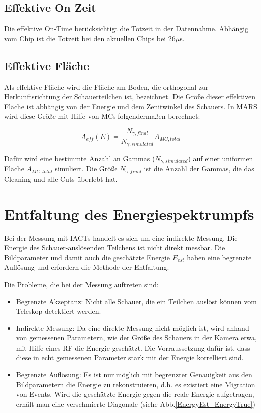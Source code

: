 \subsection{Effektive On Zeit}
Die effektive On-Time berücksichtigt die Totzeit in der Datennahme.
Abhängig vom Chip ist die Totzeit bei den aktuellen Chips bei 26$\mu$s.

\subsection{Effektive Fläche}
Als effektive Fläche wird die Fläche am Boden, die orthogonal zur Herkunftsrichtung der Schauerteilchen ist, bezeichnet.
Die Größe dieser effektiven Fläche ist abhängig von der Energie und dem Zenitwinkel des Schauers.
In MARS wird diese Größe mit Hilfe von MCs folgendermaßen berechnet:

\begin{equation}
 A_{eff}(E)=\frac{N_{\gamma, final}}{N_{\gamma, simulated}}A_{MC, total}
\end{equation}

Dafür wird eine bestimmte Anzahl an Gammas ($N_{\gamma, simulated}$) auf einer uniformen Fläche $A_{MC,total}$ simuliert. 
Die Größe $N_{\gamma, final}$ ist die Anzahl der Gammas, die das Cleaning und alle Cuts überlebt hat.


\section{Entfaltung des Energiespektrumpfs}
\label{sec:Unfolding}
Bei der Messung mit IACTs handelt es sich um eine indirekte Messung.
Die Energie des Schauer-auslösenden Teilchens ist nicht direkt messbar.
Die Bildparameter und damit auch die geschätzte Energie $E_{est}$ haben eine begrenzte Auflösung und erfordern die Methode der Entfaltung.

Die Probleme, die bei der Messung auftreten sind:

\begin{itemize}
 \item Begrenzte Akzeptanz: Nicht alle Schauer, die ein Teilchen auslöst können vom Teleskop detektiert werden.
 \item Indirekte Messung: Da eine direkte Messung nicht möglich ist, wird anhand von gemessenen Parametern, wie der Größe des Schauers in der Kamera etwa, mit Hilfe eines RF die Energie geschätzt.
       Die Vorraussetzung dafür ist, dass diese in echt gemessenen Parameter stark mit der Energie korrelliert sind.
 \item Begrenzte Auflösung: Es ist nur möglich mit begrenzter Genauigkeit aus den Bildparametern die Energie zu rekonstruieren, d.h. es existiert eine Migration von Events.
       Wird die geschätzte Energie gegen die reale Energie aufgetragen, erhält man eine verschmierte Diagonale (siehe Abb.\ref{EnergyEst_EnergyTrue})
\end{itemize}


